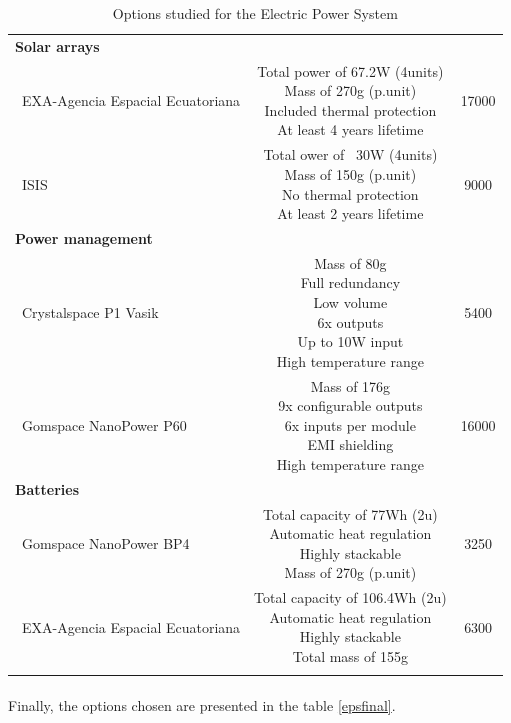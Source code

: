 \begin{longtable}{| l | c | c | }
\rowcolor[gray]{0.85} \textbf{Solar arrays} &  &  \\
	   ~EXA-Agencia Espacial Ecuatoriana & \makecell{Total power of 67.2W (4units)\\ Mass of 270g (p.unit) \\ Included thermal protection \\At least 4 years lifetime} & 17000 \\
	   \hline
	   ~ISIS & \makecell{Total ower of ~30W (4units) \\ Mass of 150g (p.unit) \\ No thermal protection \\At least 2 years lifetime} & 9000 \\
	   \hline
\rowcolor[gray]{0.85} \textbf{Power management} &  &  \\
	   ~Crystalspace P1 Vasik & \makecell{Mass of 80g \\ Full redundancy \\ Low volume \\ 6x outputs \\ Up to 10W input \\ High temperature range} & 5400 \\
	\hline
	   ~Gomspace NanoPower P60 & \makecell{Mass of 176g \\ 9x configurable outputs \\ 6x inputs per module \\ EMI shielding \\ High temperature range} & 16000 \\
	\hline
\rowcolor[gray]{0.85} \textbf{Batteries} &  &  \\
	   ~Gomspace NanoPower BP4 & \makecell{Total capacity of 77Wh (2u) \\ Automatic heat regulation \\ Highly stackable \\ Mass of 270g (p.unit)} & 3250 \\
	\hline
	~EXA-Agencia Espacial Ecuatoriana & \makecell{Total capacity of 106.4Wh (2u)\\ Automatic heat regulation \\ Highly stackable \\ Total mass of 155g} & 6300 \\
	\hline
	
\caption{Options studied for the Electric Power System}
\label{epsoptions}
\end{longtable}

\paragraph{}Finally, the options chosen are presented in the table \ref{epsfinal}.

